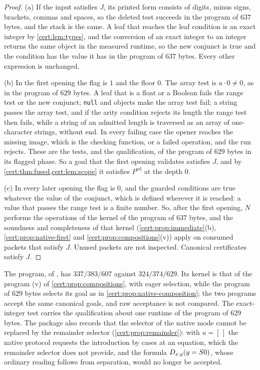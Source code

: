 \begin{proof}
(a) If the input satisfies $J$, its printed form consists of digits, minus
signs, brackets, commas and spaces, so the deleted test succeeds in the
program of $637$ bytes, and the stack is the same. A leaf that reaches the
leaf condition is an exact integer by \cref{cert:lem:types}, and the
conversion of an exact integer to an integer returns the same object in the
measured runtime, so the new conjunct is true and the condition has the value
it has in the program of $637$ bytes. Every other expression is unchanged.

(b) In the first opening the flag is $1$ and the floor $0$. The array test is
$a\cdot 0\neq 0$, as in the program of $629$ bytes. A leaf that is a float or
a Boolean fails the range test or the new conjunct; \texttt{null} and objects
make the array test fail; a string passes the array test, and if the arity
condition rejects its length the range test then fails, while a string of an
admitted length is traversed as an array of one-character strings, without
end. In every failing case the opener reaches the missing image, which is the
checking function, or a failed operation, and the run rejects. These are the
tests, and the qualification, of the program of $629$ bytes in its flagged
phase. So a goal that the first opening validates satisfies $J$, and
by \cref{cert:thm:fused,cert:lem:scope} it satisfies $P^{\mathrm{ed}}$ at the
depth $0$.

(c) In every later opening the flag is $0$, and the guarded conditions are
true whatever the value of the conjunct, which is defined wherever it is
reached: a value that passes the range test is a finite number. So, after the
first opening, $N$ performs the operations of the kernel of the program of
$637$ bytes, and the soundness and completeness of that kernel
(\cref{cert:prop:immediate}(b), \cref{cert:prop:native-first} and
\cref{cert:prop:compositions}(v)) apply on consumed packets that satisfy $J$.
Unused packets are not inspected. Canonical certificates satisfy $J$.
\end{proof}

The program, of , has $337/383/607$ against
$324/374/629$. Its kernel is that of the program (v) of
\cref{cert:prop:compositions}, with eager selection, while the program of
$629$ bytes selects its goal as in \cref{cert:prop:native-composition}; the
two programs accept the same canonical goals, and raw acceptance is not
compared. The exact-integer test carries the qualification about one runtime
of the program of $629$ bytes. The package also records that the selector of
the native mode cannot be replaced by the remainder selector
(\cref{cert:prop:remainder}): with $u=[\,]$ the native protocol requests the
introduction by cases at an equation, which the remainder selector does not
provide, and the formula $D_{x,y}(y=S 0)$, whose ordinary reading follows
from separation, would no longer be accepted.

